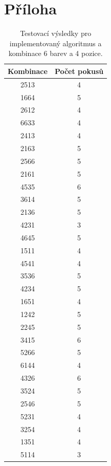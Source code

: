 \documentclass[12pt, a4paper]{article}
\begin{document}
\newpage
\section*{Příloha}  

\begin{table}[ht!]
\centering
\begin{tabular}{c | c }

Kombinace &   Počet pokusů\\
\hline
2513 & 4\\
1664 & 5\\
2612 & 4\\
6633 & 4\\
2413 & 4\\
2163 & 5\\
2566 & 5\\
2161 & 5\\
4535 & 6\\
3614 & 5\\
2136 & 5\\
4231 & 3\\
4645 & 5\\
1511 & 4\\
4541 & 4\\
3536 & 5\\
4234 & 5\\
1651 & 4\\
1242 & 5\\
2245 & 5\\
3415 & 6\\
5266 & 5\\
6144 & 4\\
4326 & 6\\
3524 & 5\\
2546 & 5\\
5231 & 4\\
3254 & 4\\
1351 & 4\\
5114 & 3\\
 

\end{tabular}
\label{tab:priloha}
\caption{Testovací výsledky pro implementovaný algoritmus a kombinace 6 barev a 4 pozice.}
\end{table}
\end{document}
